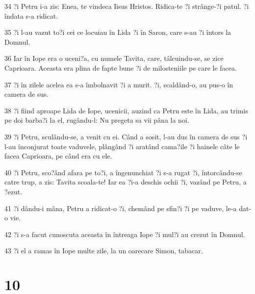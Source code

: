 \par 34 ?i Petru i-a zis: Enea, te vindeca Iisus Hristos. Ridica-te ?i strânge-?i patul. ?i îndata s-a ridicat.
\par 35 ?i l-au vazut to?i cei ce locuiau în Lida ?i în Saron, care s-au ?i întors la Domnul.
\par 36 Iar în Iope era o uceni?a, cu numele Tavita, care, tâlcuindu-se, se zice Caprioara. Aceasta era plina de fapte bune ?i de milosteniile pe care le facea.
\par 37 ?i în zilele acelea ea s-a îmbolnavit ?i a murit. ?i, scaldând-o, au pus-o în camera de sus.
\par 38 ?i fiind aproape Lida de Iope, ucenicii, auzind ca Petru este în Lida, au trimis pe doi barba?i la el, rugându-l: Nu pregeta sa vii pâna la noi.
\par 39 ?i Petru, sculându-se, a venit cu ei. Când a sosit, l-au dus în camera de sus ?i l-au înconjurat toate vaduvele, plângând ?i aratând cama?ile ?i hainele câte le facea Caprioara, pe când era cu ele.
\par 40 ?i Petru, sco?ând afara pe to?i, a îngenunchiat ?i s-a rugat ?i, întorcându-se catre trup, a zis: Tavita scoala-te! Iar ea ?i-a deschis ochii ?i, vazând pe Petru, a ?ezut.
\par 41 ?i dându-i mâna, Petru a ridicat-o ?i, chemând pe sfin?i ?i pe vaduve, le-a dat-o vie.
\par 42 ?i s-a facut cunoscuta aceasta în întreaga Iope ?i mul?i au crezut în Domnul.
\par 43 ?i el a ramas în Iope multe zile, la un oarecare Simon, tabacar.

\chapter{10}

